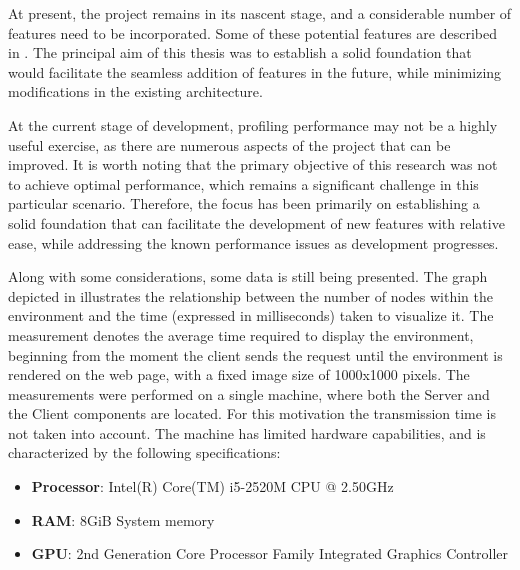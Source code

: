 At present, the project remains in its nascent stage, and a considerable number of features need to be incorporated. Some of these potential features are described in . The principal aim of this thesis was to establish a solid foundation that would facilitate the seamless addition of features in the future, while minimizing modifications in the existing architecture.\newline


At the current stage of development, profiling performance may not be a highly useful exercise, as there are numerous aspects of the project that can be improved. It is worth noting that the primary objective of this research was not to achieve optimal performance, which remains a significant challenge in this particular scenario. Therefore, the focus has been primarily on establishing a solid foundation that can facilitate the development of new features with relative ease, while addressing the known performance issues as development progresses.\newline

Along with some considerations, some data is still being presented. The graph depicted in  illustrates the relationship between the number of nodes within the environment and the time (expressed in milliseconds) taken to visualize it. The measurement denotes the average time required to display the environment, beginning from the moment the client sends the request until the environment is rendered on the web page, with a fixed image size of 1000x1000 pixels. The measurements were performed on a single machine, where both the Server and the Client components are located. For this motivation the transmission time is not taken into account. The machine has limited hardware capabilities, and is characterized by the following specifications:

\begin{itemize}
	\item \textbf{Processor}: Intel(R) Core(TM) i5-2520M CPU @ 2.50GHz
	\item \textbf{RAM}: 8GiB System memory
	\item \textbf{GPU}: 2nd Generation Core Processor Family Integrated Graphics Controller
\end{itemize}


